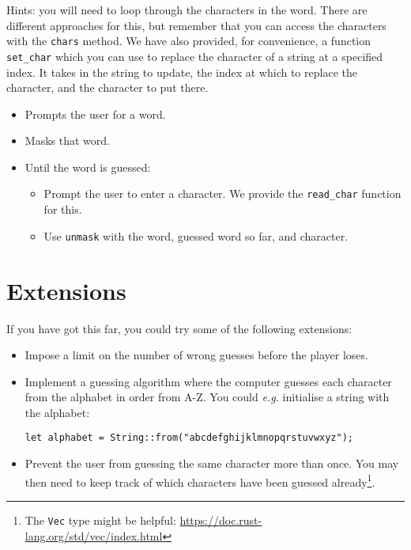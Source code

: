 
Hints: you will need to loop through the characters in the word. There are different approaches for this, but remember that you can access the characters with the \texttt{\small chars} method. We have also provided, for convenience, a function \texttt{\small set\_char} which you can use to replace the character of a string at a specified index. It takes in the string to update, the index at which to replace the character, and the character to put there. 

\begin{itemize}
    \item Prompts the user for a word.
    \item Masks that word.
    \item Until the word is guessed: 
    \begin{itemize}
        \item Prompt the user to enter a character. We provide the \texttt{read_char} function for this.
        \item Use \texttt{unmask} with the word, guessed word so far, and character.
    \end{itemize}
\end{itemize}

\taskLine

\section*{Extensions}

If you have got this far, you could try some of the following extensions:
\begin{itemize}
    \item Impose a limit on the number of wrong guesses before the player loses.
	\item Implement a guessing algorithm where the computer guesses each character from the alphabet in order from A-Z. You could \emph{e.g.} initialise a string with the alphabet:
	\begin{verbatim}
let alphabet = String::from("abcdefghijklmnopqrstuvwxyz");
    \end{verbatim}
	\item Prevent the user from guessing the same character more than once. You may then need to keep track of which characters have been guessed already\footnote{The \texttt{Vec} type might be helpful: \url{https://doc.rust-lang.org/std/vec/index.html}}. 
\end{itemize}
